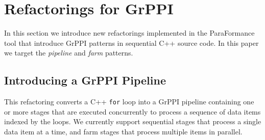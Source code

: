\section{Refactorings for GrPPI}
\label{refactoring_grppi}

In this section we introduce new refactorings implemented in the ParaFormance tool that introduce GrPPI patterns in sequential C++ source code. In this paper we target the \emph{pipeline} and \emph{farm} patterns.

\subsection{Introducing a GrPPI Pipeline}\label{refactoring-interface}

This refactoring converts a C++
\texttt{for} loop into a GrPPI pipeline containing one or more stages
that are executed concurrently to process a sequence of data items
indexed by the loops. We currently support sequential stages that
process a single data item at a time, and farm stages that process
multiple items in parallel. 


%

